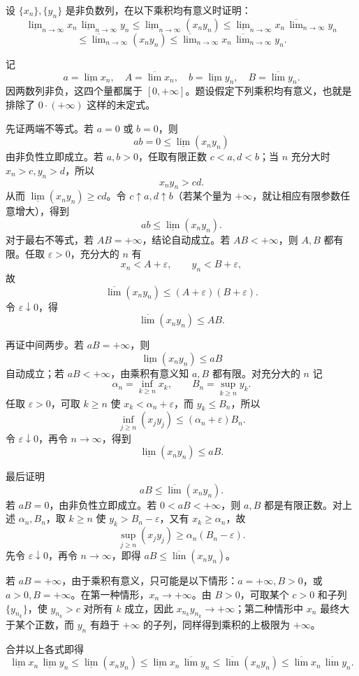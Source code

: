 \begin{xreferenceproblem}[6]
设 $\{x_n\},\{y_n\}$ 是非负数列，在以下乘积均有意义时证明：
  \[
    \underline{\lim}_{n\to\infty}x_n\,
    \underline{\lim}_{n\to\infty}y_n
    \leqslant\underline{\lim}_{n\to\infty}(x_ny_n)
    \leqslant\underline{\lim}_{n\to\infty}x_n\,
    \overline{\lim}_{n\to\infty}y_n
  \]
  \[
    \leqslant\overline{\lim}_{n\to\infty}(x_ny_n)
    \leqslant\overline{\lim}_{n\to\infty}x_n\,
    \overline{\lim}_{n\to\infty}y_n.
  \]
\end{xreferenceproblem}
\begin{xsolution}
记
\[
  a=\underline{\lim}x_n,
  \quad A=\overline{\lim}x_n,
  \quad b=\underline{\lim}y_n,
  \quad B=\overline{\lim}y_n.
\]
因两数列非负，这四个量都属于 $[0,+\infty]$。题设假定下列乘积均有意义，也就是排除了 $0\cdot(+\infty)$ 这样的未定式。

先证两端不等式。若 $a=0$ 或 $b=0$，则
\[
  ab=0\leqslant\underline{\lim}(x_ny_n)
\]
由非负性立即成立。若 $a,b>0$，任取有限正数 $c<a,d<b$；当 $n$ 充分大时 $x_n>c,y_n>d$，所以
\[
  x_ny_n>cd.
\]
从而 $\underline{\lim}(x_ny_n)\geqslant cd$。令 $c\uparrow a,d\uparrow b$（若某个量为 $+\infty$，就让相应有限参数任意增大），得到
\[
  ab\leqslant\underline{\lim}(x_ny_n).
\]
对于最右不等式，若 $AB=+\infty$，结论自动成立。若 $AB<+\infty$，则 $A,B$ 都有限。任取 $\varepsilon>0$，充分大的 $n$ 有
\[
  x_n<A+\varepsilon,
  \qquad
  y_n<B+\varepsilon,
\]
故
\[
  \overline{\lim}(x_ny_n)
  \leqslant(A+\varepsilon)(B+\varepsilon).
\]
令 $\varepsilon\downarrow0$，得
\[
  \overline{\lim}(x_ny_n)\leqslant AB.
\]

再证中间两步。若 $aB=+\infty$，则
\[
  \underline{\lim}(x_ny_n)\leqslant aB
\]
自动成立；若 $aB<+\infty$，由乘积有意义知 $a,B$ 都有限。对充分大的 $n$ 记
\[
  \alpha_n=\inf_{k\geqslant n}x_k,
  \qquad
  B_n=\sup_{k\geqslant n}y_k.
\]
任取 $\varepsilon>0$，可取 $k\geqslant n$ 使 $x_k<\alpha_n+\varepsilon$，而 $y_k\leqslant B_n$，所以
\[
  \inf_{j\geqslant n}(x_jy_j)
  \leqslant(\alpha_n+\varepsilon)B_n.
\]
令 $\varepsilon\downarrow0$，再令 $n\to\infty$，得到
\[
  \underline{\lim}(x_ny_n)\leqslant aB.
\]

最后证明
\[
  aB\leqslant\overline{\lim}(x_ny_n).
\]
若 $aB=0$，由非负性立即成立。若 $0<aB<+\infty$，则 $a,B$ 都是有限正数。对上述 $\alpha_n,B_n$，取 $k\geqslant n$ 使 $y_k>B_n-\varepsilon$，又有 $x_k\geqslant\alpha_n$，故
\[
  \sup_{j\geqslant n}(x_jy_j)
  \geqslant\alpha_n(B_n-\varepsilon).
\]
先令 $\varepsilon\downarrow0$，再令 $n\to\infty$，即得 $aB\leqslant\overline{\lim}(x_ny_n)$。

若 $aB=+\infty$，由于乘积有意义，只可能是以下情形：$a=+\infty,B>0$，或 $a>0,B=+\infty$。在第一种情形，$x_n\to+\infty$。由 $B>0$，可取某个 $c>0$ 和子列 $\{y_{n_k}\}$，使 $y_{n_k}>c$ 对所有 $k$ 成立，因此 $x_{n_k}y_{n_k}\to+\infty$；第二种情形中 $x_n$ 最终大于某个正数，而 $y_n$ 有趋于 $+\infty$ 的子列，同样得到乘积的上极限为 $+\infty$。

合并以上各式即得
\[
  \underline{\lim}x_n\,\underline{\lim}y_n
  \leqslant\underline{\lim}(x_ny_n)
  \leqslant\underline{\lim}x_n\,\overline{\lim}y_n
  \leqslant\overline{\lim}(x_ny_n)
  \leqslant\overline{\lim}x_n\,\overline{\lim}y_n.
\]
\end{xsolution}



